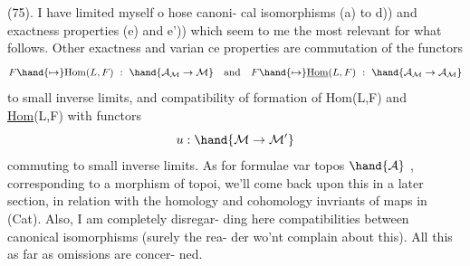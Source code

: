 \hand{\uline{\textcolor{black}{Comments on the formulaire}}} (75). I have limited myself o hose canoni-%
cal isomorphisms (a) to d)) and exactness properties (e) and e')) which
seem to me the most relevant for what follows. Other exactness and varian
ce properties are commutation of the functors
\[ F \hand{\mapsto} \mathrm{Hom}(L,F) \ : \ \hand{\mathcal{A}_{\mathcal{M}} \rightarrow \mathcal{M}} \quad \text{and} \quad F \hand{\mapsto} \underline{\mathrm{Hom}}(L,F) \ : \ \hand{\mathcal{A}_{\mathcal{M}} \rightarrow \mathcal{A}_{\mathcal{M}}} \]
to small inverse limits, and compatibility of formation of Hom(L,F) and
\uline{Hom}(L,F) with functors
\[ u : \hand{\mathcal{M} \rightarrow \mathcal{M}'} \]
commuting to small inverse limits. As for formulae   var
 topos $\hand{\mathcal{A}}$ , corresponding to a morphism of topoi, we'll come
back upon this in a later section, in relation with the homology and
cohomology invriants of maps in (Cat). Also, I am completely disregar-%
ding here compatibilities between canonical isomorphisms (surely the rea-%
der wo'nt complain about this). All this as far as omissions are concer-%
ned.


